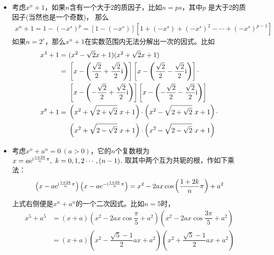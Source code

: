 \begin{itemize}[leftmargin=\inteval{\myitemleftmargin}pt,itemsep=
   \inteval{\myitemitempsep}pt,topsep=\inteval{\myitemtopsep}pt]
\item 考虑$ x^n+1 $，如果$ n $含有一个大于2的质因子，比如$ n=ps $，其中$ p $
是大于2的质因子(当然也是一个奇数)，
那么
\begin{gather*}
    x^n+1=1-(-x^s)^p=[1-(-x^s)][1+(-x^s)+(-x^s)^2-\cdots +(-x^s)^{p-1}]
\end{gather*}
如果$ n=2^r $，那么$ x^n+1 $在实数范围内无法分解出一次的因式。比如
\begin{align*}
x^4+1 =&\  (x^2-\sqrt{2}x+1)(x^2+\sqrt{2}x+1)   \\
=&\  \left[x-\left(\dfrac{\sqrt{2}}{2}+\dfrac{\sqrt{2}}{2}\mathrm{i} \right)\right] 
\left[x-\left( \dfrac{\sqrt{2}}{2}-\dfrac{\sqrt{2}}{2}\mathrm{i} \right)\right]
\cdot \\
&\ \left[x-\left(-\dfrac{\sqrt{2}}{2}+\dfrac{\sqrt{2}}{2}\mathrm{i} \right)\right]
\left[x-\left(-\dfrac{\sqrt{2}}{2}-\dfrac{\sqrt{2}}{2}\mathrm{i} \right)\right]  \\
x^8+1 =&\  \left( x^2+\sqrt{2+\sqrt{2}}\ x+1\right) \cdot
\left( x^2-\sqrt{2+\sqrt{2}}\ x+1\right) \cdot \\
&\ \left( x^2+\sqrt{2-\sqrt{2}}\ x+1\right) \cdot
\left( x^2-\sqrt{2-\sqrt{2}}\ x+1\right)
\end{align*}

\item 考虑$ x^{n}+a^n=0\ (a>0) $，它的$ n $个复数根为
$ x=a\mathrm{e}^{\mathrm{i}\frac{1+2k}{n}\pi} ,\ k=0,1,2\cdots ,(n-1) $. 
取其中两个互为共轭的根，作如下乘法：
\begin{gather*}
    \left(x-a\mathrm{e}^{\mathrm{i}\frac{1+2k}{n}\pi}\right)
    \left(x-a\mathrm{e}^{-\mathrm{i}\frac{1+2k}{n}\pi}\right)=
    x^2-2ax\cos\left(\dfrac{1+2k}{n}\pi\right) +a^2    
\end{gather*}
上式右侧便是$ x^n+a^n $的一个二次因式。比如$ n=5 $时，
\begin{align*}
    x^5+a^5 &=(x+a)\left(x^2-2ax\cos\dfrac{\pi}{5}+a^2 \right)
    \left(x^2-2ax\cos\dfrac{3\pi}{5}+a^2 \right) \\
    &=(x+a)\left(x^2-\dfrac{\sqrt{5}-1}{2} ax+a^2 \right)
    \left(x^2+\dfrac{\sqrt{5}-1}{2} ax+a^2 \right)
\end{align*}


\end{itemize}
